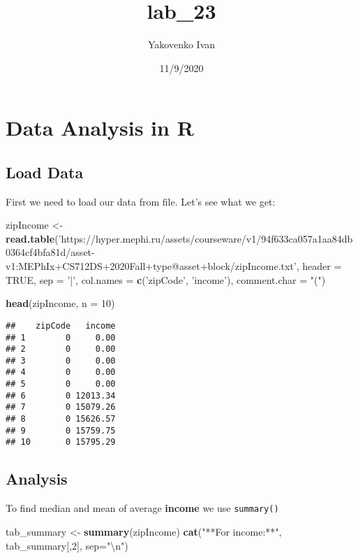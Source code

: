 \documentclass[
]{article}
\title{lab\_23}
\author{Yakovenko Ivan}
\date{11/9/2020}
\newenvironment{Shaded}{\begin{snugshade}}{\end{snugshade}}
\newcommand{\CharTok}[1]{\textcolor[rgb]{0.31,0.60,0.02}{#1}}
\newcommand{\DataTypeTok}[1]{\textcolor[rgb]{0.13,0.29,0.53}{#1}}
\newcommand{\DecValTok}[1]{\textcolor[rgb]{0.00,0.00,0.81}{#1}}
\newcommand{\KeywordTok}[1]{\textcolor[rgb]{0.13,0.29,0.53}{\textbf{#1}}}
\newcommand{\NormalTok}[1]{#1}
\newcommand{\OtherTok}[1]{\textcolor[rgb]{0.56,0.35,0.01}{#1}}
\newcommand{\StringTok}[1]{\textcolor[rgb]{0.31,0.60,0.02}{#1}}
\begin{document}
\maketitle

\hypertarget{data-analysis-in-r}{%
\section{Data Analysis in R}\label{data-analysis-in-r}}

\hypertarget{load-data}{%
\subsection{Load Data}\label{load-data}}

First we need to load our data from file. Let's see what we get:

\begin{Shaded}
\begin{Highlighting}[]
\NormalTok{zipIncome <-}\StringTok{ }\KeywordTok{read.table}\NormalTok{(}\StringTok{'https://hyper.mephi.ru/assets/courseware/v1/94f633ca057a1aa84db0364cf4bfa81d/asset-v1:MEPhIx+CS712DS+2020Fall+type@asset+block/zipIncome.txt'}\NormalTok{, }\DataTypeTok{header =} \OtherTok{TRUE}\NormalTok{, }\DataTypeTok{sep =} \StringTok{'|'}\NormalTok{, }\DataTypeTok{col.names =} \KeywordTok{c}\NormalTok{(}\StringTok{'zipCode'}\NormalTok{, }\StringTok{'income'}\NormalTok{), }\DataTypeTok{comment.char =} \StringTok{"("}\NormalTok{)}

\KeywordTok{head}\NormalTok{(zipIncome, }\DataTypeTok{n =} \DecValTok{10}\NormalTok{)}
\end{Highlighting}
\end{Shaded}

\begin{verbatim}
##    zipCode   income
## 1        0     0.00
## 2        0     0.00
## 3        0     0.00
## 4        0     0.00
## 5        0     0.00
## 6        0 12013.34
## 7        0 15079.26
## 8        0 15626.57
## 9        0 15759.75
## 10       0 15795.29
\end{verbatim}

\hypertarget{analysis}{%
\subsection{Analysis}\label{analysis}}

To find median and mean of average \textbf{income} we use
\texttt{summary()}

\begin{Shaded}
\begin{Highlighting}[]
\NormalTok{tab_summary <-}\StringTok{ }\KeywordTok{summary}\NormalTok{(zipIncome)}
\KeywordTok{cat}\NormalTok{(}\StringTok{"**For income:**"}\NormalTok{, tab_summary[,}\DecValTok{2}\NormalTok{], }\DataTypeTok{sep=}\StringTok{"}\CharTok{\textbackslash{}n}\StringTok{"}\NormalTok{)}
\end{Highlighting}
\end{Shaded}
\end{document}
